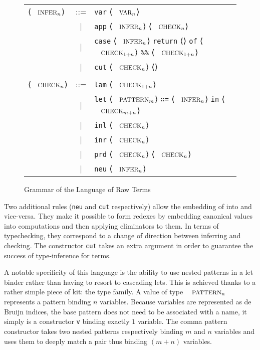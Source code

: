 \documentclass[a4paper,UKenglish]{lipics-v2016}
\begin{document}
\begin{figure}[h]\centering
\begin{tabular}{lcl}
⟨$\Inferable{}_n$⟩ & ::= & \texttt{var} ⟨$\Var{}_n$⟩ \\
                   &  |  & \texttt{app} ⟨$\Inferable{}_n$⟩ ⟨$\Checkable{}_n$⟩ \\
                   &  |  & \texttt{case} ⟨$\Inferable{}_n$⟩
                           \texttt{return} ⟨\Type{}⟩
                           \texttt{of} ⟨$\Checkable{}_{1 + n}$⟩
                           \texttt{\%\%} ⟨$\Checkable{}_{1 + n}$⟩ \\
                   &  |  & \texttt{cut} ⟨$\Checkable{}_n$⟩ ⟨\Type{}⟩ \\ \\

⟨$\Checkable{}_n$⟩ & ::= & \texttt{lam} ⟨$\Checkable{}_{1 + n}$⟩ \\
                   &  |  & \texttt{let} ⟨$\Pattern{}_m$⟩ \texttt{∷=} ⟨$\Inferable{}_n$⟩
                           \texttt{in} ⟨$\Checkable{}_{m + n}$⟩ \\
                   &  |  & \texttt{inl} ⟨$\Checkable{}_n$⟩ \\
                   &  |  & \texttt{inr} ⟨$\Checkable{}_n$⟩ \\
                   &  |  & \texttt{prd} ⟨$\Checkable{}_n$⟩ ⟨$\Checkable{}_n$⟩ \\
                   &  |  & \texttt{neu} ⟨$\Inferable{}_n$⟩ \\                  
\end{tabular}
\caption{Grammar of the Language of Raw Terms}
\end{figure}

Two additional rules (\texttt{neu} and \texttt{cut} respectively)
allow the embedding of \Inferable{} into \Checkable{} and vice-versa. They
make it possible to form redexes by embedding canonical values into
computations and then applying eliminators to them. In terms of
typechecking, they correspond to a change of direction between
inferring and checking. The constructor \texttt{cut} takes an
extra \Type{} argument in order to guarantee the success of
type-inference for \Inferable{} terms.

A notable specificity of this language is the ability to use nested
patterns in a let binder rather than having to resort to cascading
lets. This is achieved thanks to a rather simple piece of kit: the
\Pattern{} type family. A value of type $\Pattern{}_n$ represents a
pattern binding $n$ variables. Because variables are represented as
de Bruijn indices, the base pattern does not need to be associated
with a name, it simply is a constructor \texttt{v} binding exactly
$1$ variable. The comma pattern constructor takes two nested patterns
respectively binding $m$ and $n$ variables and uses them to deeply
match a pair thus binding $(m + n)$ variables.
\end{document}
